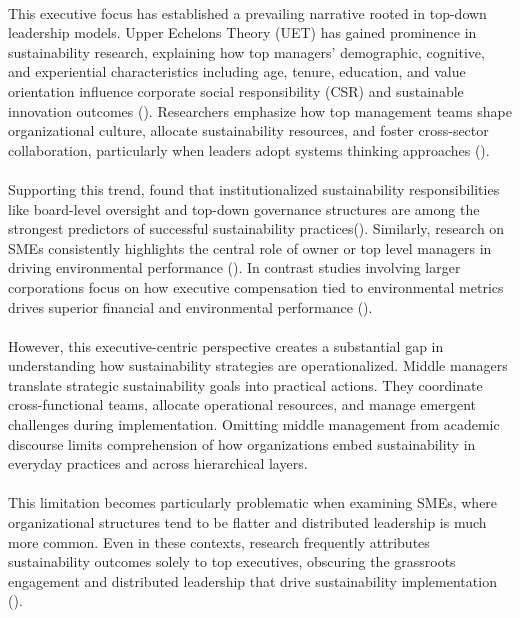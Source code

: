 	\paragraph*{} This executive focus has established a prevailing narrative rooted in top-down leadership models. Upper Echelons Theory (UET) has gained prominence in sustainability research, explaining how top managers' demographic, cognitive, and experiential characteristics including age, tenure, education, and value orientation influence corporate social responsibility (CSR) and sustainable innovation outcomes (\textcite{Waldman2008, Ioannou2015}). Researchers emphasize how top management teams shape organizational culture, allocate sustainability resources, and foster cross-sector collaboration, particularly when leaders adopt systems thinking approaches (\textcite{Dyllick2016}).
	
	\paragraph*{} Supporting this trend, \citeauthor{keil2024c} found that institutionalized sustainability responsibilities like board-level oversight and top-down governance structures are among the strongest predictors of successful sustainability practices(\textcite{keil2024c}). Similarly, research on SMEs consistently highlights the central role of owner or top level managers in driving environmental performance (\textcite{kustbash}). In contrast studies involving larger corporations focus on how executive compensation tied to environmental metrics drives superior financial and environmental performance (\textcite{Eccles2014}).
	
	\paragraph*{} However, this executive-centric perspective creates a substantial gap in understanding how sustainability strategies are operationalized. Middle managers translate strategic sustainability goals into practical actions. They coordinate cross-functional teams, allocate operational resources, and manage emergent challenges during implementation. Omitting middle management from academic discourse limits comprehension of how organizations embed sustainability in everyday practices and across hierarchical layers.
	
	\paragraph*{} This limitation becomes particularly problematic when examining SMEs, where organizational structures tend to be flatter and distributed leadership is much more common. Even in these contexts, research frequently attributes sustainability outcomes solely to top executives, obscuring the grassroots engagement and distributed leadership that drive sustainability implementation (\textcite{birkinshaw2010}).
	
